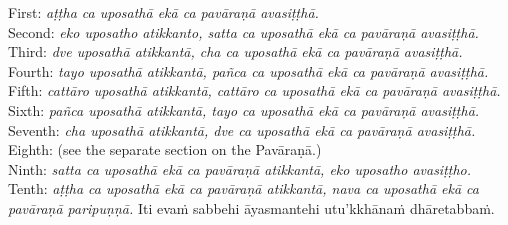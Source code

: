 {{{{{					\hspace*{0.5em}First: \textit{aṭṭha ca uposathā ekā ca pavāraṇā avasiṭṭhā.}\\
					\hspace*{0.5em}Second: \textit{eko uposatho atikkanto, satta ca uposathā ekā ca pavāraṇā avasiṭṭhā.}\\
					\hspace*{0.5em}Third: \textit{dve uposathā atikkantā, cha ca uposathā ekā ca pavāraṇā avasiṭṭhā.}\\
					\hspace*{0.5em}Fourth: \textit{tayo uposathā atikkantā, pañca ca uposathā ekā ca pavāraṇā avasiṭṭhā.}\\
					\hspace*{0.5em}Fifth: \textit{cattāro uposathā atikkantā, cattāro ca uposathā ekā ca pavāraṇā avasiṭṭhā.}\\
					\hspace*{0.5em}Sixth: \textit{pañca uposathā atikkantā, tayo ca uposathā ekā ca pavāraṇā avasiṭṭhā.}\\
					\hspace*{0.5em}Seventh: \textit{cha uposathā atikkantā, dve ca uposathā ekā ca pavāraṇā avasiṭṭhā.}\\
					\hspace*{0.5em}Eighth: (see the separate section on the Pavāraṇā.)\\
					\hspace*{0.5em}Ninth: \textit{satta ca uposathā ekā ca pavāraṇā atikkantā, eko uposatho avasiṭṭho.}\\
					\hspace*{0.5em}Tenth: \textit{aṭṭha ca uposathā ekā ca pavāraṇā atikkantā, nava ca uposathā ekā ca pavāraṇā paripuṇṇā.}}}}}}\makeatother \thickspace
Iti evaṁ sabbehi āyasmantehi utu'kkhānaṁ dhāretabbaṁ.

